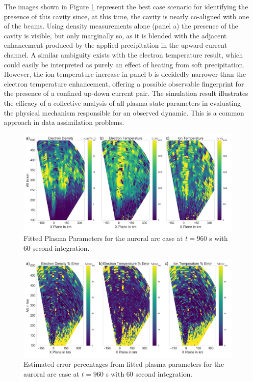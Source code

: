 \documentclass[draft,ras]{agutex}
\begin{document}
\begin{article}
The images shown in Figure \ref{fig:fplparamst60} represent the best case scenario for identifying the presence of this cavity since, at this time, the cavity is nearly co-aligned with one of the beams. Using density measurements alone (panel a) the presence of the cavity is visible, but only marginally so, as it is blended with the adjacent enhancement produced by the applied precipitation in the upward current channel.  A similar ambiguity exists with the electron temperature result, which could easily be interpreted as purely an effect of heating from soft precipitation. However, the ion temperature increase in panel b is decidedly narrower than the electron temperature enhancement, offering a possible observable fingerprint for the presence of a confined up-down current pair.  The simulation result illustrates the efficacy of a collective analysis of all plasma state parameters in evaluating the physical mechanism responsible for an observed dynamic. This is a common approach in data assimilation problems.


\begin{figure}[!t]
\centering
\includegraphics[width=6in]{0960_60_int}
\caption{Fitted Plasma Parameters for the auroral arc case at $t=960$ s with 60 second integration.}
\label{fig:fplparamst60}
\end{figure}

\begin{figure}[!t]
\centering
\includegraphics[width=6in]{0960_60_int_err}
\caption{Estimated error percentages from fitted plasma parameters for the auroral arc case at $t=960$ s with 60 second integration.}
\label{fig:fplparamst60err}
\end{figure}


\end{article}
\end{document}
